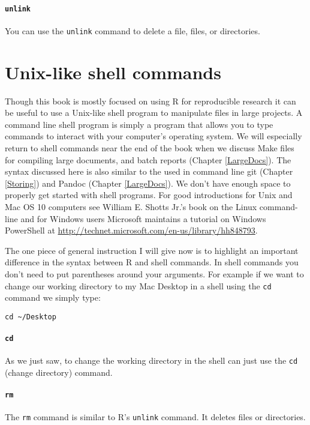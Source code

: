 \paragraph{{\tt{unlink}}}

You can use the {\tt{unlink}} command to delete a file, files, or directories. 

\section{Unix-like shell commands} 

Though this book is mostly focused on using R for reproducible research it can be useful to use a Unix-like shell program to manipulate files in large projects. A command line shell program is simply a program that allows you to type commands to interact with your computer's operating system.\cite{ShottsJr2012} We will especially return to shell commands near the end of the book when we discuss Make files for compiling large documents, and batch reports (Chapter \ref{LargeDocs}). The syntax discussed here is also similar to the used in command line git (Chapter \ref{Storing}) and Pandoc (Chapter \ref{LargeDocs}). We don't have enough space to properly get started with shell programs. For good introductions for Unix and Mac OS 10 computers see William E. Shotts Jr.'s book on the Linux command-line\cite{ShottsJr2012} and for Windows users Microsoft maintains a tutorial on Windows PowerShell at \url{http://technet.microsoft.com/en-us/library/hh848793}.

The one piece of general instruction I will give now is to highlight an important difference in the syntax between R and shell commands. In shell commands you don't need to put parentheses around your arguments. For example if we want to change our working directory to my Mac Desktop in a shell using the {\tt{cd}} command we simply type:

\begin{knitrout}
\color{fgcolor}\begin{kframe}
\begin{verbatim}
cd ~/Desktop
\end{verbatim}
\end{kframe}
\end{knitrout}


\paragraph{{\tt{cd}}}

As we just saw, to change the working directory in the shell can just use the {\tt{cd}} (change directory) command.

\paragraph{{\tt{rm}}}

The {\tt{rm}} command is similar to R's {\tt{unlink}} command. It deletes files or directories.
